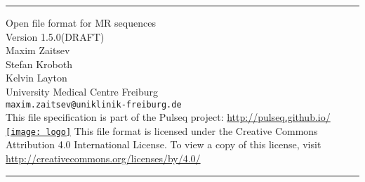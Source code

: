 \documentclass{article}
\date{}
\author{}
\def\myversionmajor{1}
\def\myversionminor{5}
\def\myversionrevision{0}
\def\myversion{\myversionmajor.\myversionminor.\myversionrevision }
\begin{document}
\begin{titlepage}
\begin{centering}
\rule{\textwidth}{5pt}\vskip1cm
\Huge{Open file format for MR sequences \\}
\vspace{1cm}
\LARGE{Version \myversion (DRAFT)\\}
\vspace{1cm}
\large Maxim Zaitsev\\ Stefan Kroboth\\ Kelvin Layton\\ 
\vspace{1cm}
\large University Medical Centre Freiburg \\%
 \verb+maxim.zaitsev@uniklinik-freiburg.de+\\%
 \vspace{1cm}
 This file specification is part of the Pulseq project:
 \vspace{0.5cm}
 \url{http://pulseq.github.io/}\\
 \href{http://pulseq.github.io/}{\texttt{[image: logo]}}
 \vfill
\small This file format is licensed under the Creative Commons Attribution 4.0 International License. To view a copy of this license, visit \url{ http://creativecommons.org/licenses/by/4.0/ }\\
\rule{\textwidth}{5pt}
\end{centering}
\end{titlepage}

\newpage

\setlength\parindent{0pt}
\setlength{\parskip}{0.4\baselineskip}%

\tableofcontents

\setlength\parindent{0pt}
\setlength{\parskip}{\baselineskip}%

\newpage
\end{document}
